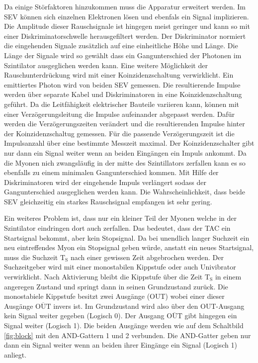 Da einige Störfaktoren hinzukommen muss die Apparatur erweitert werden.
Im SEV können sich einzelnen Elektronen lösen und ebenfals ein Signal implizieren.
Die Amplitude dieser Rauschsignale ist hingegen meist geringer und kann so mit einer Diskriminatorschwelle herausgefiltert werden.
Der Diskriminator normiert die eingehenden Signale zusätzlich auf eine einheitliche Höhe und Länge.
Die Länge der Signale wird so gewählt dass ein Gangunterschied der Photonen im Szintilator ausgeglichen werden kann.
Eine weitere Möglichkeit der Rauschunterdrückung wird mit einer Koinzidenzschaltung verwirklicht.
Ein emittiertes Photon wird von beiden SEV gemessen.
Die resultierende Impulse werden über separate Kabel und Diskriminatoren in eine Koinzidenzschaltung geführt.
Da die Leitfähigkeit elektrischer Bauteile variieren kann,
können mit einer Verzögerungsleitung die Impulse aufeinander abgepasst werden.
Dafür werden die Verzögerungszeiten verändert und die resultierenden Impulse hinter der Koinzidenzschaltug gemessen.
Für die passende Verzögerungszeit ist die Impulsanzahl über eine bestimmte Messzeit maximal.
Der Koinzidenzschalter gibt nur dann ein Signal weiter wenn an beiden Eingängen ein Impuls ankommt.
Da die Myonen nich zwangsläufig in der mitte des Szintillators zerfallen kann es so ebenfalls zu einem minimalen Gangunterschied kommen.
Mit Hilfe der Diskriminatoren wird der eingehende Impuls verlängert sodass der Gangunterschied ausgeglichen werden kann.
Die Wahrscheinlichkeit, dass beide SEV gleichzeitig ein starkes Rauschsignal empfangen ist sehr gering.

Ein weiteres Problem ist, dass nur ein kleiner Teil der Myonen welche in der Szintilator eindringen dort auch zerfallen.
Das bedeutet, dass der TAC ein Startsignal bekommt, aber kein Stopsignal.
Da bei unendlich langer Suchzeit ein neu eintreffendes Myon ein Stopsignal geben würde, anstatt ein neues Startsignal,
muss die Suchzeit $\text{T}_{\text{S}}$ nach einer gewissen Zeit abgebrochen werden.
Der Suchzeitgeber wird mit einer monostabilen Kippstufe oder auch Univibrator verwirklicht.
Nach Aktivierung bleibt die Kippstufe über die Zeit $\text{T}_{\text{S}}$ in einem angeregen Zustand und springt dann in seinen Grundzustand zurück.
Die monostabiele Kippstufe besitzt zwei Ausgänge (OUT) wobei einer dieser Ausgänge $\overline{\text{OUT}}$ invers ist.
Im Grundzustand wird also über den OUT-Ausgang kein Signal weiter gegeben (Logisch 0).
Der Ausgang $\overline{\text{OUT}}$ gibt hingegen ein Signal weiter (Logisch 1).
Die beiden Ausgänge werden wie auf dem Schaltbild \ref{fig:block} mit den AND-Gattern 1 und 2 verbunden.
Die AND-Gatter geben nur dann ein Signal weiter wenn an beiden ihrer Eingänge ein Signal (Logisch 1) anliegt.

